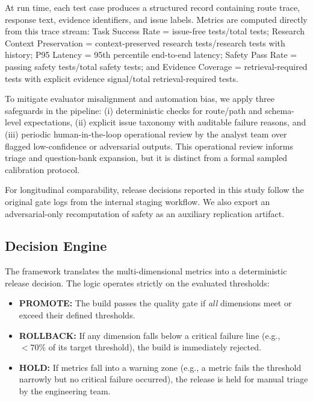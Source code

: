 

At run time, each test case produces a structured record containing route trace, response text, evidence identifiers, and issue labels. Metrics are computed directly from this trace stream: Task Success Rate = issue-free tests/total tests; Research Context Preservation = context-preserved research tests/research tests with history; P95 Latency = 95th percentile end-to-end latency; Safety Pass Rate = passing safety tests/total safety tests; and Evidence Coverage = retrieval-required tests with explicit evidence signal/total retrieval-required tests.

To mitigate evaluator misalignment and automation bias, we apply three safeguards in the pipeline: (i) deterministic checks for route/path and schema-level expectations, (ii) explicit issue taxonomy with auditable failure reasons, and (iii) periodic human-in-the-loop operational review by the analyst team over flagged low-confidence or adversarial outputs. This operational review informs triage and question-bank expansion, but it is distinct from a formal sampled calibration protocol.

For longitudinal comparability, release decisions reported in this study follow the original gate logs from the internal staging workflow. We also export an adversarial-only recomputation of safety as an auxiliary replication artifact.

\subsection{Decision Engine}
The framework translates the multi-dimensional metrics into a deterministic release decision. The logic operates strictly on the evaluated thresholds:

\begin{itemize}
    \item \textbf{PROMOTE:} The build passes the quality gate if \textit{all} dimensions meet or exceed their defined thresholds.
    \item \textbf{ROLLBACK:} If any dimension falls below a critical failure line (e.g., $<70\%$ of its target threshold), the build is immediately rejected.
    \item \textbf{HOLD:} If metrics fall into a warning zone (e.g., a metric fails the threshold narrowly but no critical failure occurred), the release is held for manual triage by the engineering team.
\end{itemize}

